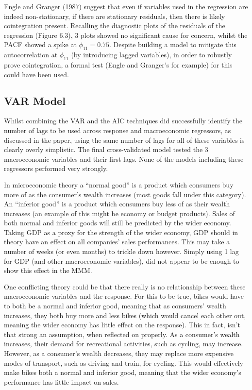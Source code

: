 \documentclass[11pt, a4paper]{article}
\begin{document}
Engle and Granger (1987) suggest that even if variables used in the regression are indeed non-stationary, if there are stationary residuals, then there is likely cointegration present. Recalling the diagnostic plots of the residuals of the regression (Figure 6.3), 3 plots showed no significant cause for concern, whilst the PACF showed a spike at $\phi_{11} = 0.75$. Despite building a model to mitigate this autocorrelation at $\phi_{11}$ (by introducing lagged variables), in order to robustly prove cointegration, a formal test (Engle and Granger’s for example) for this could have been used. 

\subsection{VAR Model}

Whilst combining the VAR and the AIC techniques did successfully identify the number of lags to be used across response and macroeconomic regressors, as discussed in the paper, using the same number of lags for all of these variables is clearly overly simplistic. The final cross-validated model tested the 3 macroeconomic variables and their first lags. None of the models including these regressors performed very strongly. 

In microeconomic theory a “normal good” is a product which consumers buy more of as the consumer’s wealth increases (most goods fall under this category). An “inferior good” is a product which consumers buy less of as their wealth increases (an example of this might be economy or budget products). Sales of both normal and inferior goods will still be predicted by the wider economy. Taking GDP as a proxy for the strength of the wider economy, GDP should in theory have an effect on all companies’ sales performances. This may take a number of weeks (or even months) to trickle down however. Simply using 1 lag for GDP (and other macroeconomic variables), did not appear to be enough to show this effect in the MMM. 

One conflicting theory could be that there really is no relationship between these macroeconomic variables and the response. For this to be true, bikes would have to both be a normal and inferior good, meaning that as consumers’ wealth increases, they both buy more and less bikes (which would cancel each other out, meaning the wider economy has little effect on the response). This in fact, isn’t that strong an assumption, when reflected on properly. As a consumer’s wealth increases, their demand for recreational activities, such as cycling, may increase. However, as a consumer’s wealth decreases, they may replace more expensive modes of transport, such as driving and train, for cycling. This would effectively make bikes both a normal and inferior good, meaning that the wider economy’s performance has little impact on sales. 
\end{document}
